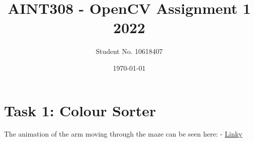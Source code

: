 \documentclass [11pt]{article}
\begin{document}
							
\title{\bf AINT308 - OpenCV Assignment 1 2022} 	
\author{Student No. 10618407} 								
\date{\today} 										
\maketitle 												
{}			
\newpage			
\setcounter{page}{2}								
\tableofcontents 
\newpage

\section{Task 1: Colour Sorter}	

The animation of the arm moving through the maze can be seen here: - \href{Link}{Linky}
\end{document}
